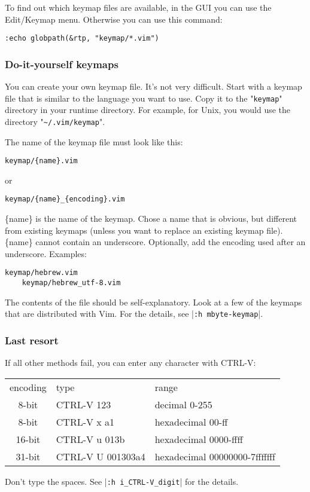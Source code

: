 To find out which keymap files are available, in the GUI you can use the Edit/Keymap menu.
Otherwise you can use this command:

\begin{Verbatim}[samepage=true]
 :echo globpath(&rtp, "keymap/*.vim")
\end{Verbatim}

\subsubsection{Do-it-yourself keymaps}
You can create your own keymap file.
It's not very difficult.
Start with a keymap file that is similar to the language you want to use.
Copy it to the "\verb!keymap!" directory in your runtime directory.
For example, for Unix, you would use the directory "\verb!~/.vim/keymap!".

The name of the keymap file must look like this:

\begin{Verbatim}[samepage=true]
    keymap/{name}.vim 
\end{Verbatim}
or
\begin{Verbatim}[samepage=true]
    keymap/{name}_{encoding}.vim 
\end{Verbatim}

\{name\} is the name of the keymap.
Chose a name that is obvious, but different from existing keymaps (unless you want to replace an existing keymap file).
\{name\} cannot contain an underscore.
Optionally, add the encoding used after an underscore.
Examples:

\begin{Verbatim}[samepage=true]
    keymap/hebrew.vim 
    keymap/hebrew_utf-8.vim 
\end{Verbatim}

The contents of the file should be self-explanatory.
Look at a few of the keymaps that are distributed with Vim.
For the details, see |\verb!:h mbyte-keymap!|.

\subsubsection{Last resort}
If all other methods fail, you can enter any character with CTRL-V:

\begin{center} \begin{tabular}{c l l}
				encoding & type & range \\
				8-bit & CTRL-V 123 & decimal 0-255 \\
				8-bit & CTRL-V x a1 & hexadecimal 00-ff \\
				16-bit & CTRL-V u 013b & hexadecimal 0000-ffff \\
				31-bit & CTRL-V U 001303a4 & hexadecimal 00000000-7fffffff \\
\end{tabular} \end{center}

Don't type the spaces.
See |\verb!:h i_CTRL-V_digit!| for the details.
\clearpage
